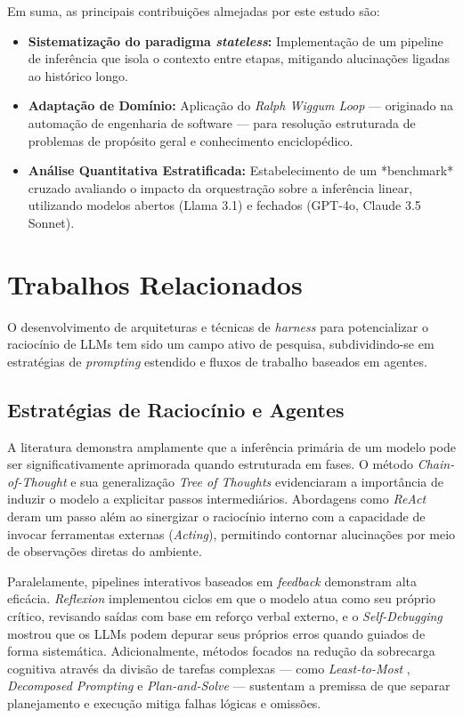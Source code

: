 \documentclass[a4paper,10pt,twocolumn]{article}
\begin{document}
Em suma, as principais contribuições almejadas por este estudo são:
\begin{itemize}
    \item \textbf{Sistematização do paradigma \textit{stateless}:} Implementação de um pipeline de inferência que isola o contexto entre etapas, mitigando alucinações ligadas ao histórico longo.
    \item \textbf{Adaptação de Domínio:} Aplicação do \textit{Ralph Wiggum Loop} --- originado na automação de engenharia de software --- para resolução estruturada de problemas de propósito geral e conhecimento enciclopédico.
    \item \textbf{Análise Quantitativa Estratificada:} Estabelecimento de um *benchmark* cruzado avaliando o impacto da orquestração sobre a inferência linear, utilizando modelos abertos (Llama 3.1) e fechados (GPT-4o, Claude 3.5 Sonnet).
\end{itemize}

\section{Trabalhos Relacionados}

O desenvolvimento de arquiteturas e técnicas de \textit{harness} para potencializar o raciocínio de LLMs tem sido um campo ativo de pesquisa, subdividindo-se em estratégias de \textit{prompting} estendido e fluxos de trabalho baseados em agentes.

\subsection{Estratégias de Raciocínio e Agentes}

A literatura demonstra amplamente que a inferência primária de um modelo pode ser significativamente aprimorada quando estruturada em fases. O método \textit{Chain-of-Thought} \cite{wei2022chain} e sua generalização \textit{Tree of Thoughts} \cite{yao2023tree} evidenciaram a importância de induzir o modelo a explicitar passos intermediários. Abordagens como \textit{ReAct} \cite{yao2022react} deram um passo além ao sinergizar o raciocínio interno com a capacidade de invocar ferramentas externas (\textit{Acting}), permitindo contornar alucinações por meio de observações diretas do ambiente. 

Paralelamente, pipelines interativos baseados em \textit{feedback} demonstram alta eficácia. \textit{Reflexion} \cite{shinn2023reflexion} implementou ciclos em que o modelo atua como seu próprio crítico, revisando saídas com base em reforço verbal externo, e o \textit{Self-Debugging} \cite{chen2023selfdebug} mostrou que os LLMs podem depurar seus próprios erros quando guiados de forma sistemática. Adicionalmente, métodos focados na redução da sobrecarga cognitiva através da divisão de tarefas complexas --- como \textit{Least-to-Most} \cite{zhou2022least}, \textit{Decomposed Prompting} \cite{khot2022decomposed} e \textit{Plan-and-Solve} \cite{wang2023plan} --- sustentam a premissa de que separar planejamento e execução mitiga falhas lógicas e omissões.
\end{document}
